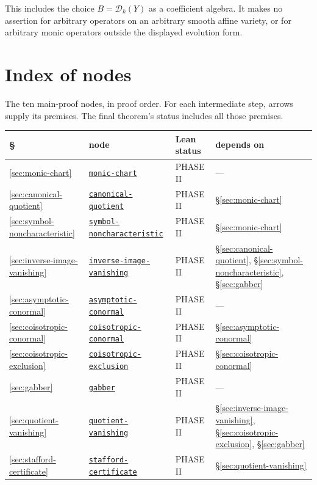 \documentclass[11pt]{article}
\theoremstyle{plain}
\theoremstyle{definition}
\theoremstyle{remark}
\theoremstyle{plain}
\newcommand{\backtomap}{%
  \hfill\raisebox{0.15ex}{\footnotesize\hyperref[fig:map]{$\uparrow$\,proof map}}}
\begin{document}
This includes the choice $B=\mathcal D_k(Y)$ as a coefficient algebra.
It makes no assertion for arbitrary operators on an arbitrary smooth affine
variety, or for arbitrary monic operators outside the displayed evolution form.

\clearpage
\section*{Index of nodes}
\label{sec:index}
\backtomap

\noindent The ten main-proof nodes, in proof order.
For each intermediate step, arrows supply its premises. The final theorem's
status includes all those premises.

\vspace{1ex}
{\footnotesize
\setlength{\tabcolsep}{5pt}
\renewcommand{\arraystretch}{1.25}
\begin{tabular}{@{}p{0.6cm}>{\raggedright\arraybackslash}p{4.3cm}>{\raggedright\arraybackslash}p{3.6cm}>{\raggedright\arraybackslash}p{6.4cm}@{}}
\hline
\S & node & Lean status & depends on\\
\hline
\ref{sec:monic-chart} & \hyperref[sec:monic-chart]{\texttt{monic-chart}} &
  \textsf{PHASE II} & ---\\
\ref{sec:canonical-quotient} & \hyperref[sec:canonical-quotient]{\texttt{canonical-quotient}} &
  \textsf{PHASE II} & \S\ref{sec:monic-chart}\\
\ref{sec:symbol-noncharacteristic} & \hyperref[sec:symbol-noncharacteristic]{\texttt{symbol-noncharacteristic}} &
  \textsf{PHASE II} & \S\ref{sec:monic-chart}\\
\ref{sec:inverse-image-vanishing} & \hyperref[sec:inverse-image-vanishing]{\texttt{inverse-image-vanishing}} &
  \textsf{PHASE II} &
  \S\ref{sec:canonical-quotient}, \S\ref{sec:symbol-noncharacteristic}, \S\ref{sec:gabber}\\
\ref{sec:asymptotic-conormal} & \hyperref[sec:asymptotic-conormal]{\texttt{asymptotic-conormal}} &
  \textsf{PHASE II} & ---\\
\ref{sec:coisotropic-conormal} & \hyperref[sec:coisotropic-conormal]{\texttt{coisotropic-conormal}} &
  \textsf{PHASE II} & \S\ref{sec:asymptotic-conormal}\\
\ref{sec:coisotropic-exclusion} & \hyperref[sec:coisotropic-exclusion]{\texttt{coisotropic-exclusion}} &
  \textsf{PHASE II} & \S\ref{sec:coisotropic-conormal}\\
\ref{sec:gabber} & \hyperref[sec:gabber]{\texttt{gabber}} &
  \textsf{PHASE II} & ---\\
\ref{sec:quotient-vanishing} & \hyperref[sec:quotient-vanishing]{\texttt{quotient-vanishing}} &
  \textsf{PHASE II} & \S\ref{sec:inverse-image-vanishing}, \S\ref{sec:coisotropic-exclusion}, \S\ref{sec:gabber}\\
\ref{sec:stafford-certificate} & \hyperref[sec:stafford-certificate]{\texttt{stafford-certificate}} &
  \textsf{PHASE II} & \S\ref{sec:quotient-vanishing}\\
\hline
\end{tabular}
\par}
\end{document}
